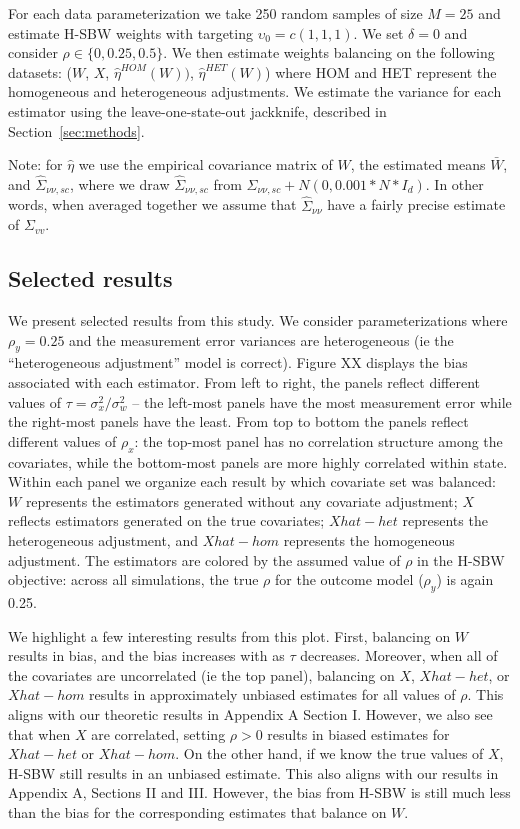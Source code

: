 For each data parameterization we take 250 random samples of size $M = 25$ and estimate H-SBW weights with targeting $\upsilon_0 = c(1, 1, 1)$. We set $\delta = 0$ and consider $\rho \in \{0, 0.25, 0.5\}$. We then estimate weights balancing on the following datasets: ($W$, $X$, $\hat{\eta}^{HOM}(W))$, $\hat{\eta}^{HET}(W)$) where HOM and HET represent the homogeneous and heterogeneous adjustments. We estimate the variance for each estimator using the leave-one-state-out jackknife, described in Section~\ref{sec:methods}. 
 
Note: for $\hat{\eta}$ we use the empirical covariance matrix of $W$, the estimated means $\bar{W}$, and $\hat{\Sigma}_{\nu\nu, sc}$, where we draw $\hat{\Sigma}_{\nu\nu, sc}$ from $\Sigma_{\nu\nu, sc} + N(0, 0.001*N*I_d)$. In other words, when averaged together we assume that $\hat{\Sigma}_{\nu\nu}$ have a fairly precise estimate of $\Sigma_{vv}$.

\subsection{Selected results}

We present selected results from this study. We consider parameterizations where $\rho_y = 0.25$ and the measurement error variances are heterogeneous (ie the ``heterogeneous adjustment'' model is correct). Figure XX displays the bias associated with each estimator. From left to right, the panels reflect different values of $\tau = \sigma^2_x/\sigma^2_w$ -- the left-most panels have the most measurement error while the right-most panels have the least. From top to bottom the panels reflect different values of $\rho_x$: the top-most panel has no correlation structure among the covariates, while the bottom-most panels are more highly correlated within state. Within each panel we organize each result by which covariate set was balanced: $W$ represents the estimators generated without any covariate adjustment; $X$ reflects estimators generated on the true covariates; $Xhat-het$ represents the heterogeneous adjustment, and $Xhat-hom$ represents the homogeneous adjustment. The estimators are colored by the assumed value of $\rho$ in the H-SBW objective: across all simulations, the true $\rho$ for the outcome model ($\rho_y$) is again 0.25.

We highlight a few interesting results from this plot. First, balancing on $W$ results in bias, and the bias increases with as $\tau$ decreases. Moreover, when all of the covariates are uncorrelated (ie the top panel), balancing on $X$, $Xhat-het$, or $Xhat-hom$ results in approximately unbiased estimates for all values of $\rho$. This aligns with our theoretic results in Appendix A Section I. However, we also see that when $X$ are correlated, setting $\rho > 0$ results in biased estimates for $Xhat-het$ or $Xhat-hom$. On the other hand, if we know the true values of $X$, H-SBW still results in an unbiased estimate. This also aligns with our results in Appendix A, Sections II and III. However, the bias from H-SBW is still much less than the bias for the corresponding estimates that balance on $W$. 

